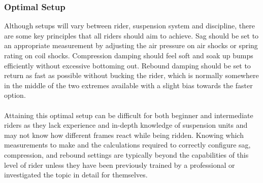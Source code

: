 	\subsubsection{Optimal Setup}
		Although setups will vary between rider, suspension system and discipline, there are some key principles that all riders should aim to achieve. Sag should be set to an appropriate measurement by adjusting the air pressure on air shocks or spring rating on coil shocks. Compression damping should feel soft and soak up bumps efficiently without excessive bottoming out. Rebound damping should be set to return as fast as possible without bucking the rider, which is normally somewhere in the middle of the two extremes available with a slight bias towards the faster option.
		\\\\
		Attaining this optimal setup can be difficult for both beginner and intermediate riders as they lack experience and in-depth knowledge of suspension units and may not know how different frames react while being ridden. Knowing which measurements to make and the calculations required to correctly configure sag, compression, and rebound settings are typically beyond the capabilities of this level of rider unless they have been previously trained by a professional or investigated the topic in detail for themselves.
